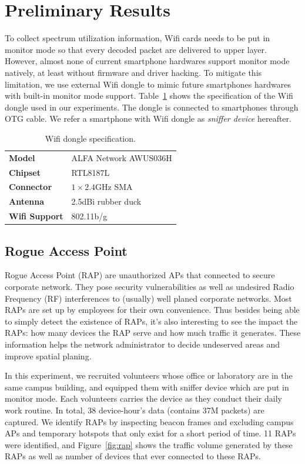 \section{Preliminary Results}
\label{sec-results}

To collect spectrum utilization information, Wifi cards needs to be put in
monitor mode so that every decoded packet are delivered to upper layer.
However, almost none of current smartphone hardwares support monitor mode natively,
at least without firmware and driver hacking. To mitigate this limitation, we
use external Wifi dongle to mimic future smartphones hardwares with built-in
monitor mode support. Table~\ref{tab:dongle} shows the specification of the Wifi
dongle used in our experiments. The dongle is connected to smartphones through
OTG cable. We refer a smartphone with Wifi dongle as \textit{sniffer device}
hereafter.

\begin{table}[t!]
  \centering
  \begin{tabular}{ll}
    \toprule
    \textbf{Model} & ALFA Network AWUS036H \\
    \textbf{Chipset} & RTL8187L \\
    \textbf{Connector} & $1\times2.4$GHz SMA \\
    \textbf{Antenna} & 2.5dBi rubber duck \\
    \textbf{Wifi Support} & 802.11b/g \\
    \bottomrule
  \end{tabular}
  \caption{Wifi dongle specification.}
  \label{tab:dongle}
\end{table}


\subsection{Rogue Access Point}

Rogue Access Point (RAP) are unauthorized APs that connected to secure corporate
network. They pose security vulnerabilities as well as undesired Radio Frequency
(RF) interferences to (usually) well planed corporate networks. Most
RAPs are set up by employees for their own convenience. Thus besides being able to
simply detect the existence of RAPs, it's also interesting to see the impact the
RAPs: how many devices the RAP serve and how much traffic it
generates. These information helps the network administrator to decide
undeserved areas and improve spatial planing.

In this experiment, we recruited volunteers whose office or laboratory are in
the same campus building, and equipped them with sniffer device which are put in
monitor mode. Each volunteers carries the device as they conduct their
daily work routine. In total, 38 device-hour's data (contains 37M packets) are
captured.  We identify RAPs by inspecting beacon frames and excluding campus APs
and temporary hotspots that only exist for a short period of time. 11 RAPs were
identified, and Figure~\ref{fig:rap} shows the traffic volume generated by these
RAPs as well as number of devices that ever connected to these RAPs.

